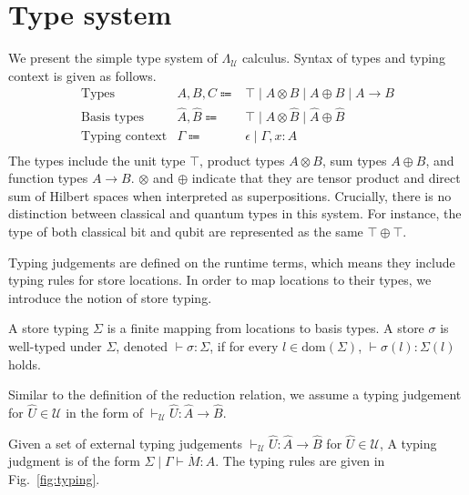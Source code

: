 \section{Type system} \label{sec:type-system}
We present the simple type system of $\Lambda_\mathcal{U}$ calculus.
Syntax of types and typing context is given as follows.
\begin{equation*}
  \begin{array}{lrl}
    \text{Types}          & A, B, C \Coloneqq          & \top\mid A\otimes B\mid A\oplus B\mid A\rightarrow B    \\
    \text{Basis types}    & \hat{A}, \hat{B} \Coloneqq & \top\mid\hat{A}\otimes \hat{B}\mid\hat{A}\oplus \hat{B} \\
    \text{Typing context} & \Gamma \Coloneqq           & \epsilon \mid \Gamma,x:A                                \\
  \end{array}
\end{equation*}
The types include the unit type $\top$, product types $A \otimes B$, sum types $A \oplus B$, and function types $A \rightarrow B$.
$\otimes$ and $\oplus$ indicate that they are tensor product and direct sum of Hilbert spaces when interpreted as superpositions.
Crucially, there is no distinction between classical and quantum types in this system.
For instance, the type of both classical bit and qubit are represented as the same $\top \oplus \top$.

Typing judgements are defined on the runtime terms, which means they include typing rules for store locations.
In order to map locations to their types, we introduce the notion of store typing.
\begin{dfn}
  A store typing $\Sigma$ is a finite mapping from locations to basis types.
  A store $\sigma$ is well-typed under $\Sigma$, denoted $\vdash \sigma : \Sigma$, if for every $l\in\text{dom}(\Sigma)$, $\vdash \sigma(l) : \Sigma(l)$ holds.
\end{dfn}

Similar to the definition of the reduction relation, we assume a typing judgement for $\hat{U}\in\mathcal{U}$ in the form of $\vdash_\mathcal{U} \hat{U} : \hat{A} \rightarrow \hat{B}$.
\begin{dfn}
  Given a set of external typing judgements $\vdash_\mathcal{U} \hat{U} : \hat{A} \rightarrow \hat{B}$ for $\hat{U}\in\mathcal{U}$,
  A typing judgment is of the form $\Sigma \mid \Gamma \vdash \dot{M} : A$.
  The typing rules are given in Fig.~\ref{fig:typing}.
\end{dfn}

